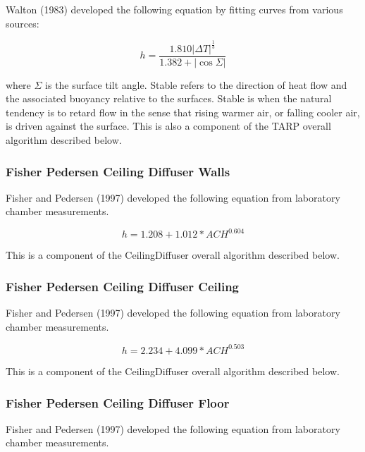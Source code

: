 Walton (1983) developed the following equation by fitting curves from various sources:

\begin{equation}
h = \frac{{1.810{{\left| {\Delta T} \right|}^{\frac{1}{3}}}}}{{1.382 + \left| {\cos \Sigma } \right|}}
\end{equation}

where $\Sigma$ is the surface tilt angle. Stable refers to the direction of heat flow and the associated buoyancy relative to the surfaces. Stable is when the natural tendency is to retard flow in the sense that rising warmer air, or falling cooler air, is driven against the surface. This is also a component of the TARP overall algorithm described below.

\subsubsection{Fisher Pedersen Ceiling Diffuser Walls}\label{fisher-pedersen-ceiling-diffuser-walls}

Fisher and Pedersen (1997) developed the following equation from laboratory chamber measurements.

\begin{equation}
h = 1.208 + 1.012 * AC{H^{0.604}}
\end{equation}

This is a component of the CeilingDiffuser overall algorithm described below.

\subsubsection{Fisher Pedersen Ceiling Diffuser Ceiling}\label{fisher-pedersen-ceiling-diffuser-ceiling}

Fisher and Pedersen (1997) developed the following equation from laboratory chamber measurements.

\begin{equation}
h = 2.234 + 4.099 * AC{H^{0.503}}
\end{equation}

This is a component of the CeilingDiffuser overall algorithm described below.

\subsubsection{Fisher Pedersen Ceiling Diffuser Floor}\label{fisher-pedersen-ceiling-diffuser-floor}

Fisher and Pedersen (1997) developed the following equation from laboratory chamber measurements.

